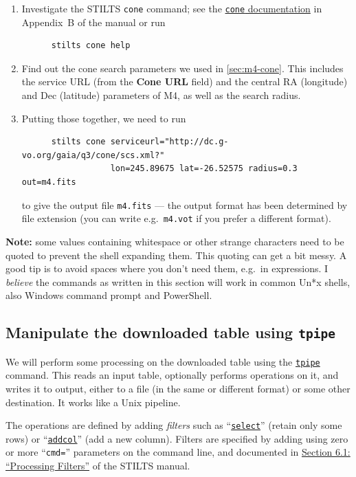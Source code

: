 \documentclass{article}
\newcommand{\lab}[1]{\textbf{#1}}
\newcommand{\bhref}[2]{\href{#1}{{\color{blue}#2}}}
\newcommand{\stiltsmanref}[2]
               {\bhref{http://www.starlink.ac.uk/stilts/sun256/#1.html}{#2}}
\newcommand{\stiltsttref}[1]{\stiltsmanref{#1}{\texttt{#1}}}
\newcommand{\paragap}{\vspace{1.5ex}}
\begin{document}
\begin{enumerate}
\item Investigate the STILTS {\tt cone} command;
      see the \stiltsmanref{cone}{\texttt{cone} documentation}
      in Appendix~B of the manual
      or run
      \preverb
      \begin{verbatim}
      stilts cone help
      \end{verbatim}
      \postverb
\item Find out the cone search parameters we used in \ref{sec:m4-cone}.
      This includes the service URL (from the \lab{Cone URL} field)
      and the central RA (longitude) and Dec (latitude) parameters of M4,
      as well as the search radius.
\item Putting those together, we need to run
      \preverb
      \begin{verbatim}
      stilts cone serviceurl="http://dc.g-vo.org/gaia/q3/cone/scs.xml?" 
                  lon=245.89675 lat=-26.52575 radius=0.3 out=m4.fits
      \end{verbatim}
      \postverb
      to give the output file {\tt m4.fits} --- the output format has been
      determined by file extension
      (you can write e.g.\ {\tt m4.vot} if you prefer a different format).
      \paragap
\end{enumerate}

{\bf Note:} some values containing whitespace or other strange
characters need to be quoted to prevent the shell expanding them.
This quoting can get a bit messy.
A good tip is to avoid spaces where you don't need them, e.g.\ in expressions.
I {\em believe\/} the commands as written in this section will work
in common Un*x shells, also Windows command prompt and PowerShell.

\subsection{Manipulate the downloaded table using {\tt tpipe}}

We will perform some processing on the downloaded table using
the \stiltsttref{tpipe} command.
This reads an input table, optionally performs operations on it,
and writes it to output, either to a file (in the same or different format)
or some other destination.  It works like a Unix pipeline.
\paragap

The operations are defined by adding {\em filters\/} such as
``\stiltsttref{select}'' (retain only some rows) or
``\stiltsttref{addcol}'' (add a new column).
Filters are specified by adding using zero
or more ``{\tt cmd=}'' parameters on the command line,
and documented in
\stiltsmanref{filterSteps}{Section 6.1: ``Processing Filters''}
of the STILTS manual.
\paragap
\end{document}
